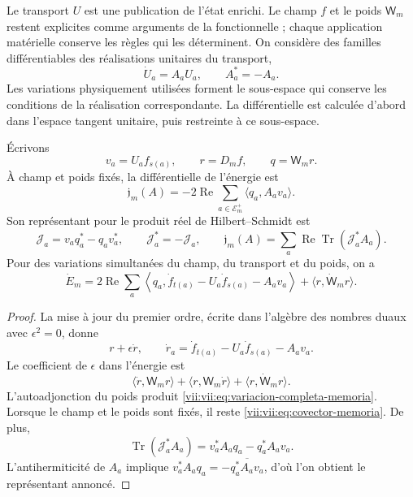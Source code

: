 Le transport \(U\) est une publication de l'état enrichi. Le champ \(f\) et le poids \(\mathsf W_m\) restent explicites comme arguments de la fonctionnelle ; chaque application matérielle conserve les règles qui les déterminent. On considère des familles différentiables des réalisations unitaires du transport,
\[
 \dot U_a=A_aU_a,\qquad A_a^*=-A_a.
\]
Les variations physiquement utilisées forment le sous-espace qui conserve
les conditions de la réalisation correspondante. La différentielle est
calculée d'abord dans l'espace tangent unitaire, puis restreinte
à ce sous-espace.

\begin{proposition}
\label{vii:vii:prop:covector-memoria}
Écrivons
\[
 v_a=U_af_{s(a)},\qquad r=D_mf,\qquad q=\mathsf W_mr.
\]
À champ et poids fixés, la différentielle de l'énergie est
\begin{equation}
 \mathfrak j_m(A)=-2\operatorname{Re}
       \sum_{a\in\mathcal E_m^+}\langle q_a,A_av_a\rangle .
 \label{vii:vii:eq:covector-memoria}
\end{equation}
Son représentant pour le produit réel de Hilbert--Schmidt est
\begin{equation}
 \mathcal J_a=v_aq_a^*-q_av_a^*,\qquad
 \mathcal J_a^*=-\mathcal J_a,\qquad
 \mathfrak j_m(A)=
 \sum_a\operatorname{Re}\operatorname{Tr}(\mathcal J_a^*A_a).
 \label{vii:vii:eq:representante-corriente-discreta}
\end{equation}
Pour des variations simultanées du champ, du transport et du poids, on a
\begin{equation}
 \dot E_m=
 2\operatorname{Re}\sum_a
 \left\langle q_a,\dot f_{t(a)}-U_a\dot f_{s(a)}-A_av_a\right\rangle
 +\langle r,\dot{\mathsf W}_mr\rangle .
 \label{vii:vii:eq:variacion-completa-memoria}
\end{equation}
\end{proposition}

\begin{proof}
La mise à jour du premier ordre, écrite dans l'algèbre des nombres duaux avec \(\epsilon^2=0\), donne
\[
 r+\epsilon\dot r,\qquad
 \dot r_a=\dot f_{t(a)}-U_a\dot f_{s(a)}-A_av_a.
\]
Le coefficient de \(\epsilon\) dans l'énergie est
\[
 \langle\dot r,\mathsf W_mr\rangle+
 \langle r,\mathsf W_m\dot r\rangle+
 \langle r,\dot{\mathsf W}_mr\rangle.
\]
L'autoadjonction du poids produit
\eqref{vii:vii:eq:variacion-completa-memoria}. Lorsque le champ et le poids sont fixés, il reste
\eqref{vii:vii:eq:covector-memoria}. De plus,
\[
 \operatorname{Tr}(\mathcal J_a^*A_a)
 =v_a^*A_aq_a-q_a^*A_av_a.
\]
L'antihermiticité de \(A_a\) implique
\(v_a^*A_aq_a=-\overline{q_a^*A_av_a}\), d'où l'on obtient
le représentant annoncé.
\end{proof}

